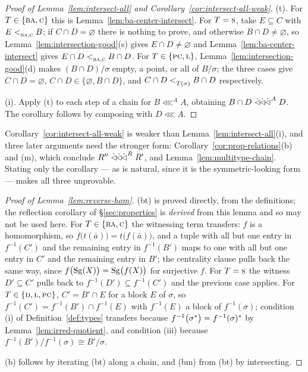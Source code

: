 \begin{proof}[Proof of Lemma~\ref{lem:intersect-all} and
  Corollary~\ref{cor:intersect-all-weak}]
(t). For $T\in\{\textup{\textsc{ba}},\textup{\textsc{c}}\}$ this is Lemma~\ref{lem:ba-center-intersect}. For
$T=\textup{\textsc{s}}$, take $E\subseteq C$ with $E<_{\textup{\textsc{ba}},\textup{\textsc{c}}}^{}B$; if $C\cap D=\varnothing$
there is nothing to prove, and otherwise $B\cap D\neq\varnothing$, so
Lemma~\ref{lem:intersection-good}(s) gives $E\cap D\neq\varnothing$ and
Lemma~\ref{lem:ba-center-intersect} gives $E\cap D<_{\textup{\textsc{ba}},\textup{\textsc{c}}}^{}B\cap D$. For
$T\in\{\textup{\textsc{pc}},\textup{\textsc{l}}\}$, Lemma~\ref{lem:intersection-good}(d) makes $(B\cap D)/\sigma$
empty, a point, or all of $B/\sigma$; the three cases give $C\cap D=\varnothing$,
$C\cap D\in\{\varnothing,B\cap D\}$, and $C\cap D<_{T(\sigma)}^{}B\cap D$
respectively.

(i). Apply (t) to each step of a chain for $B\lll^{A}A$, obtaining
$B\cap D\mathrel{\dot{\lhd}\!\dot{\lhd}\!\dot{\lhd}}^{A}D$. The corollary follows by composing with $D\lll A$.
\end{proof}

\begin{hazard}\label{haz:intersect-all-strength}
Corollary~\ref{cor:intersect-all-weak} is weaker than
Lemma~\ref{lem:intersect-all}(i), and three later arguments need the stronger
form: Corollary~\ref{cor:prop-relations}(b) and (m), which conclude
$R''\mathrel{\dot{\lhd}\!\dot{\lhd}\!\dot{\lhd}}^{R}R'$, and Lemma~\ref{lem:multitype-chain}. Stating only the
corollary --- as is natural, since it is the symmetric-looking form --- makes
all three unprovable.
\end{hazard}

\begin{proof}[Proof of Lemma~\ref{lem:reverse-hom}]
(bt) is proved directly, from the definitions; the reflection corollary of
\S\ref{sec:properties} is \emph{derived} from this lemma and so may not be used
here. For
$T\in\{\textup{\textsc{ba}},\textup{\textsc{c}}\}$ the witnessing term transfers: $f$ is a homomorphism, so
$f\bigl(t(\bar a)\bigr)=t\bigl(f(\bar a)\bigr)$, and a tuple with all but one
entry in $f^{-1}(C')$ and the remaining entry in $f^{-1}(B')$ maps to one with
all but one entry in $C'$ and the remaining entry in $B'$; the centrality
clause pulls back the same way, since $f\bigl(\operatorname{Sg}(X)\bigr)=\operatorname{Sg}\bigl(f(X)\bigr)$
for surjective $f$. For $T=\textup{\textsc{s}}$ the witness $D'\subseteq C'$ pulls back to
$f^{-1}(D')\subseteq f^{-1}(C')$ and the previous case applies. For
$T\in\{\textup{\textsc{d}},\textup{\textsc{l}},\textup{\textsc{pc}}\}$, $C'=B'\cap E$ for a block $E$ of $\sigma$, so
$f^{-1}(C')=f^{-1}(B')\cap f^{-1}(E)$ with $f^{-1}(E)$ a block of
$f^{-1}(\sigma)$; condition (i) of Definition~\ref{def:types} transfers because
$f^{-1}\bigl(\sigma^{*}\bigr)=f^{-1}(\sigma)^{*}$ by
Lemma~\ref{lem:irred-quotient}, and condition (iii) because
$f^{-1}(B')/f^{-1}(\sigma)\cong B'/\sigma$.

(b) follows by iterating (bt) along a chain, and (bm) from (bt) by
intersecting.
\end{proof}

